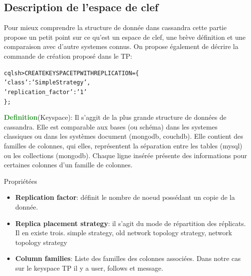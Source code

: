 \subsection{Description de l'espace de clef}
\par Pour mieux comprendre la structure de donnée dans cassandra
cette partie propose un petit point sur ce qu'est un espace de clef,
une brève définition et une comparaison avec d'autre systemes connus.
On propose également de décrire la commande de création proposé dans le TP: \newline

\begin{tt}
\begin{alltt}
cqlsh> CREATE KEYSPACE TP WITH REPLICATION = \{
\indent		'class' : 'SimpleStrategy',
\indent		'replication\_factor' : '1'
\};
\end{alltt}
\end{tt}

\textcolor{ForestGreen}{\textbf{Definition}}(Keyspace): Il s'aggit de la plus grande 
structure de données de cassandra. Elle est comparable aux bases (ou schéma)
dans les systemes classiques ou dans les systèmes document (mongodb, couchdb). Elle contient des familles de colonnes,  qui elles, représentent
la séparation entre les tables (mysql) ou les collections (mongodb). Chaque ligne insérée présente des informations pour certaines colonnes
d'un famille de colonnes.

\begin{block}{Propriétées}
\begin{itemize}
\item \textbf{Replication factor}: définit le nombre de noeud possédant un copie de la donnée. 
\item \textbf{Replica placement strategy}: il s'agit du mode de répartition des réplicats. Il en 
existe trois. simple strategy,  old network topology strategy, network topology strategy
\item \textbf{Column families}: Liste des familles des colonnes associées. Dans notre cas sur le keyspace
TP il y a user, follows et message.
\end{itemize}
\end{block}

